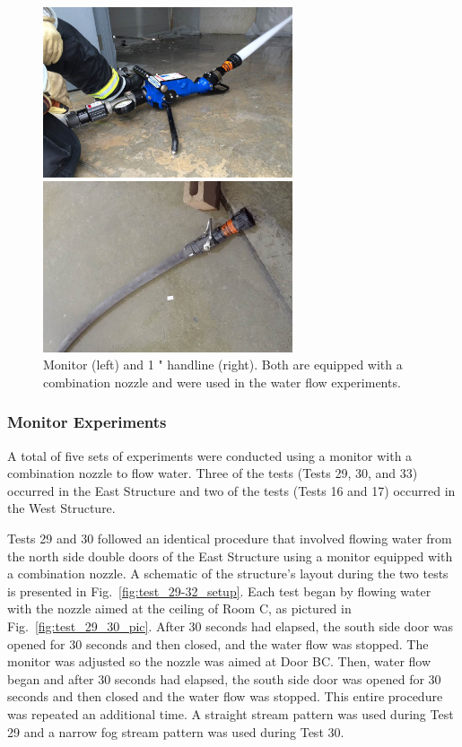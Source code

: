 \documentclass[12pt,oneside]{book}
\begin{document}
\begin{figure}[!ht]
\minipage{3in}
\begin{center}
	\includegraphics[width=2.9in]{../Pictures/monitor}
\end{center} 
\endminipage \hfill
\minipage{3in}
\begin{center}
	\includegraphics[width=2.9in]{../Pictures/handline}
\end{center}
\endminipage \hfill
\caption[Monitor and Handline Equipped with Combination Nozzle]{Monitor (left) and 1 " handline (right). Both are equipped with a combination nozzle and were used in the water flow experiments.}
\label{fig:monitor+handline}
\end{figure}
\FloatBarrier

\subsubsection{Monitor Experiments}
\label{sec:Water_Flow_Monitor_Procedure}
A total of five sets of experiments were conducted using a monitor with a combination nozzle to flow water. Three of the tests (Tests 29, 30, and 33) occurred in the East Structure and two of the tests (Tests 16 and 17) occurred in the West Structure. 

Tests 29 and 30 followed an identical procedure that involved flowing water from the north side double doors of the East Structure using a monitor equipped with a combination nozzle. A schematic of the structure's layout during the two tests is presented in Fig.~\ref{fig:test_29-32_setup}. Each test began by flowing water with the nozzle aimed at the ceiling of Room C, as pictured in Fig.~\ref{fig:test_29_30_pic}. After 30 seconds had elapsed, the south side door was opened for 30 seconds and then closed, and the water flow was stopped. The monitor was adjusted so the nozzle was aimed at Door BC. Then, water flow began and after 30 seconds had elapsed, the south side door was opened for 30 seconds and then closed and the water flow was stopped. This entire procedure was repeated an additional time. A straight stream pattern was used during Test 29 and a narrow fog stream pattern was used during Test 30. 
\end{document}
